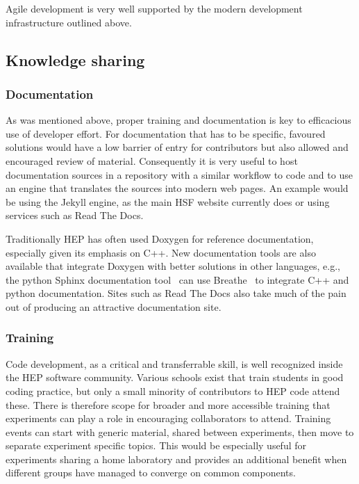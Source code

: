 \documentclass[12pt,a4paper]{article}
\begin{document}
Agile development is very well supported by the modern development
infrastructure outlined above.~

\hypertarget{knowledge-sharing}{%
\subsection{Knowledge sharing}\label{knowledge-sharing}}

\hypertarget{documentation}{%
\subsubsection{Documentation}\label{documentation}}

As was mentioned above, proper training and documentation is key to
efficacious use of developer effort. For documentation that has to be
specific, favoured solutions would have a low barrier of entry for
contributors but also allowed and encouraged review of material.
Consequently it is very useful to host documentation sources in a
repository with a similar workflow to code and to use an engine that
translates the sources into modern web pages. An example would be using
the Jekyll engine, as the main HSF website currently does or using
services such as Read The Docs.

Traditionally HEP has often used Doxygen\cite{Doxygen} for reference
documentation, especially given its emphasis on C++. New documentation tools are also
available that integrate Doxygen with better solutions in other
languages, e.g., the python Sphinx documentation tool~\cite{Sphinx} can use
Breathe~\cite{breathe} to integrate C++ and python documentation. Sites such as
Read The Docs also take much of the pain out of producing an attractive documentation site.

\hypertarget{training}{%
\subsubsection{Training}\label{training}}

Code development, as a critical and transferrable skill, is well
recognized inside the HEP software community. Various schools exist that
train students in good coding practice, but only a small minority of
contributors to HEP code attend these. There is therefore scope for
broader and more accessible training that experiments can play a role in
encouraging collaborators to attend. Training events can start with
generic material, shared between experiments, then move to separate
experiment specific topics. This would be especially useful for
experiments sharing a home laboratory and provides an additional benefit
when different groups have managed to converge on common components.
\end{document}
